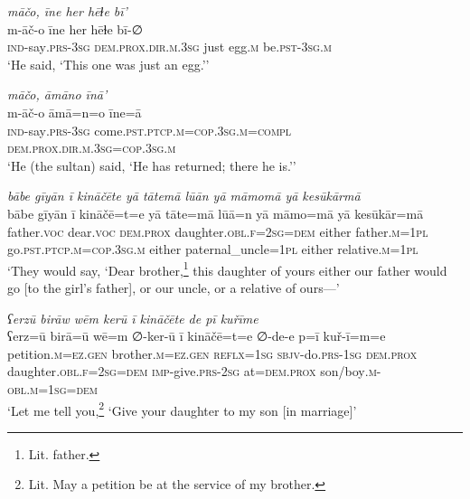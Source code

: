 \ea \label{ŽH.95}
\textit{māčo, īne her hēɫe bī’} \\ 
\gll m-āč-o īne her hēɫe bī-∅ \\ 
 \textsc{ind-}say\textsc{.prs}\textsc{-3sg} \textsc{dem.prox}\textsc{.dir}\textsc{.m}\textsc{.3sg} just egg\textsc{.m} be\textsc{.pst}\textsc{-3sg}\textsc{.m} \\ 
\glt `He said, ‘This one was just an egg.’'
\z 
 
\ea \label{ŽH.111}
\textit{māčo, āmāno īnā’} \\ 
\gll m-āč-o āmā=n=o īne=ā \\ 
 \textsc{ind-}say\textsc{.prs}\textsc{-3sg} come\textsc{.pst}\textsc{.ptcp}\textsc{.m}\textsc{=cop}\textsc{.3sg}\textsc{.m}\textsc{=compl} \textsc{dem.prox}\textsc{.dir}\textsc{.m}\textsc{.3sg}\textsc{=cop}\textsc{.3sg}\textsc{.m} \\ 
\glt `He (the sultan) said, ‘He has returned; there he is.’'
\z 
 
\ea \label{RE.4}
\textit{bābe gīyān ī kināčēte yā tātemā lūān yā māmomā yā kesūkārmā} \\ 
\gll bābe gīyān ī kināčē=t=e yā tāte=mā lūā=n yā māmo=mā yā kesūkār=mā \\ 
 father.\textsc{voc} dear.\textsc{voc} \textsc{dem.prox} daughter\textsc{.obl}\textsc{.f}\textsc{=\textsc{2sg}}\textsc{=dem} either father\textsc{.m}\textsc{=\textsc{1pl}} go\textsc{.pst}\textsc{.ptcp}\textsc{.m}\textsc{=cop}\textsc{.3sg}\textsc{.m} either paternal\_uncle\textsc{=\textsc{1pl}} either relative\textsc{.m}\textsc{=\textsc{1pl}} \\ 
\glt `They would say, ‘Dear brother,\footnote{Lit. father.} this daughter of yours \—either our father would go [to the girl’s father], or our uncle, or a relative of ours—'
\z 
 
\ea \label{RE.7}
\textit{ʕerzū birāw wēm kerū ī kināčēte de pī kuřīme} \\ 
\gll ʕerz=ū birā=ū wē=m ∅-ker-ū ī kināčē=t=e ∅-de-e p=ī kuř-ī=m=e \\ 
 petition\textsc{.m}\textsc{\textsc{=ez.gen}} brother\textsc{.m}\textsc{\textsc{=ez.gen}} \textsc{reflx}\textsc{=\textsc{1sg}} \textsc{sbjv-}do\textsc{.prs}\textsc{-\textsc{1sg}} \textsc{dem.prox} daughter\textsc{.obl}\textsc{.f}\textsc{=\textsc{2sg}}\textsc{=dem} \textsc{imp-}give\textsc{.prs}-\textsc{2sg} at=\textsc{dem.prox} son/boy\textsc{.m}\textsc{-obl}\textsc{.m}\textsc{=\textsc{1sg}}\textsc{=dem} \\ 
\glt `Let me tell you,\footnote{Lit. May a petition be at the service of my brother.} ‘Give your daughter to my son [in marriage]'
\z 
 
